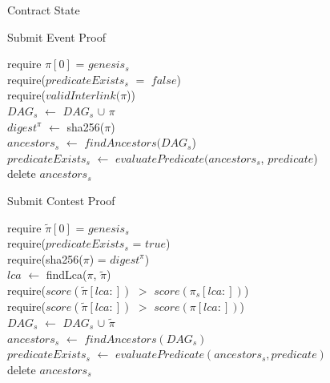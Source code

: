\begin{algorithm}
    \caption{\label{algo:hash_and_resubmit_data}Contract State}

\end{algorithm}

\begin{algorithm}
    \caption{\label{algo:hash_and_resubmit_submit}
Submit Event Proof}
    require $\pi[0]$ = $genesis_{s}$ \\
    require($predicateExists_{s}$ $=$ $false$) \\
    require($validInterlink(\pi$))\\
    $DAG_{s}$ $\leftarrow$ $DAG_{s}$ $\cup$ $\pi$\\
    $digest^{\pi}$ $\leftarrow$ sha256($\pi$) \\
    $ancestors_{s}$ $\leftarrow$ $findAncestors(DAG_{s}$)\\
    $predicateExists_{s}$ $\leftarrow$ $evaluatePredicate(ancestors_{s}$,
    $predicate$)\\
    delete $ancestors_{s}$\\
\end{algorithm}

\vspace{0.1cm}

\begin{algorithm}
    \caption{\label{algo:hash_and_resubmit_contest}Submit Contest Proof}

    require $\tilde\pi[0]$ = $genesis_{s}$ \\
    require($predicateExists_{s}$ = $true$) \\
    require(sha256($\pi$) = $digest^{\pi}$) \\
    $lca$ $\leftarrow$ findLca($\pi$, $\tilde\pi$) \\
    require($score(\tilde\pi[lca:])$ $>$ $score(\pi_{s}[lca:])$) \\
    require($score(\tilde\pi[lca:])$ $>$ $score(\pi[lca:])$) \\
    $DAG_{s}$ $\leftarrow$ $DAG_{s}$ $\cup$ $\tilde\pi$\\
    $ancestors_{s}$ $\leftarrow$ $findAncestors(DAG_{s})$\\
    $predicateExists_{s}$ $\leftarrow$ $evaluatePredicate(ancestors_{s}, predicate)$\\
    delete $ancestors_{s}$\\
\end{algorithm}
